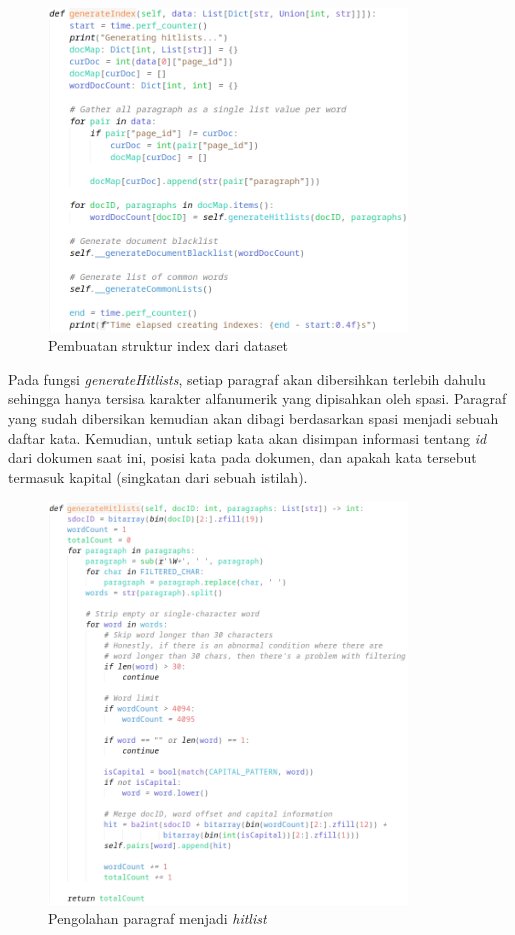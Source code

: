 \begin{figure}[H]
  \centering{}
	\includegraphics[width=0.85\textwidth]{gambar/implementasi_generateindex}
  \caption{Pembuatan struktur index dari dataset}
\end{figure}

Pada fungsi \textit{generateHitlists}, setiap paragraf akan dibersihkan terlebih 
dahulu sehingga hanya tersisa karakter alfanumerik yang dipisahkan oleh spasi.
Paragraf yang sudah dibersikan kemudian akan dibagi berdasarkan spasi menjadi 
sebuah daftar kata. Kemudian, untuk setiap kata akan disimpan informasi tentang 
\textit{id} dari dokumen saat ini, posisi kata pada dokumen, dan apakah kata 
tersebut termasuk kapital (singkatan dari sebuah istilah).

\begin{figure}[H]
  \centering{}
	\includegraphics[width=0.85\textwidth]{gambar/implementasi_generatehitlists}
  \caption{Pengolahan paragraf menjadi \textit{hitlist}}
\end{figure}

